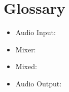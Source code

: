 \chapter{Glossary}

\begin{itemize}
	\item Audio Input:
	\item Mixer:
	\item Mixed:
	\item Audio Output:
\end{itemize}	